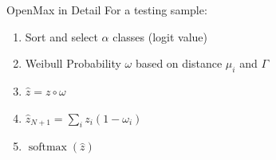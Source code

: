\begin{frame}{OpenMax in Detail}
	For a testing sample:
	\begin{enumerate}
		\item Sort and select $\alpha$ classes (logit value)
		\item Weibull Probability $\omega$ based on distance $\mu_i$ and $\Gamma$
		\item $\hat{z} = z \circ \omega $
		\item $\hat{z}_{N+1} = \sum_i z_i (1 - \omega_i)$
		\item $\operatorname{softmax}(\hat{z})$
	\end{enumerate}
\end{frame}

